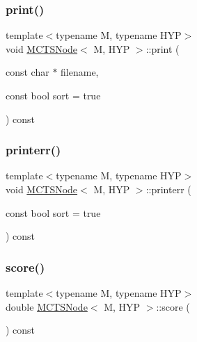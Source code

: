 \subsubsection{\texorpdfstring{print()}{print()}\hspace{0.1cm}{\footnotesize\ttfamily [3/3]}}
{\footnotesize\ttfamily template$<$typename M, typename H\+YP$>$ \\
void \hyperlink{class_m_c_t_s_node}{M\+C\+T\+S\+Node}$<$ M, H\+YP $>$\+::print (\begin{DoxyParamCaption}\item[{const char $\ast$}]{filename,  }\item[{const bool}]{sort = {\ttfamily true} }\end{DoxyParamCaption}) const\hspace{0.3cm}{\ttfamily [inline]}}

\mbox{\label{class_m_c_t_s_node_a258317ddcd07a57a34a9a2eeec6f10b9}} 
\subsubsection{\texorpdfstring{printerr()}{printerr()}}
{\footnotesize\ttfamily template$<$typename M, typename H\+YP$>$ \\
void \hyperlink{class_m_c_t_s_node}{M\+C\+T\+S\+Node}$<$ M, H\+YP $>$\+::printerr (\begin{DoxyParamCaption}\item[{const bool}]{sort = {\ttfamily true} }\end{DoxyParamCaption}) const\hspace{0.3cm}{\ttfamily [inline]}}

\mbox{\label{class_m_c_t_s_node_a1a051c22b8821704a10bf33dbd426c4d}} 
\subsubsection{\texorpdfstring{score()}{score()}}
{\footnotesize\ttfamily template$<$typename M, typename H\+YP$>$ \\
double \hyperlink{class_m_c_t_s_node}{M\+C\+T\+S\+Node}$<$ M, H\+YP $>$\+::score (\begin{DoxyParamCaption}{ }\end{DoxyParamCaption}) const\hspace{0.3cm}{\ttfamily [inline]}}

